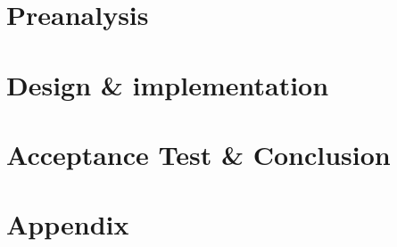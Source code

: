 

\pagestyle{fancy}



\part{Preanalysis}




\part{Design \& implementation}











\part{Acceptance Test \& Conclusion}











\label{bib:mybiblio}
 
 \newpage
\fancyhead[RE,LO]{}
 \titleformat{\section}[hang]{\Large\bfseries}{\thesection\hsp\textcolor{black}{|}\hsp}{0pt}{\Large\bfseries}

 \part{Appendix}
 \appendix




